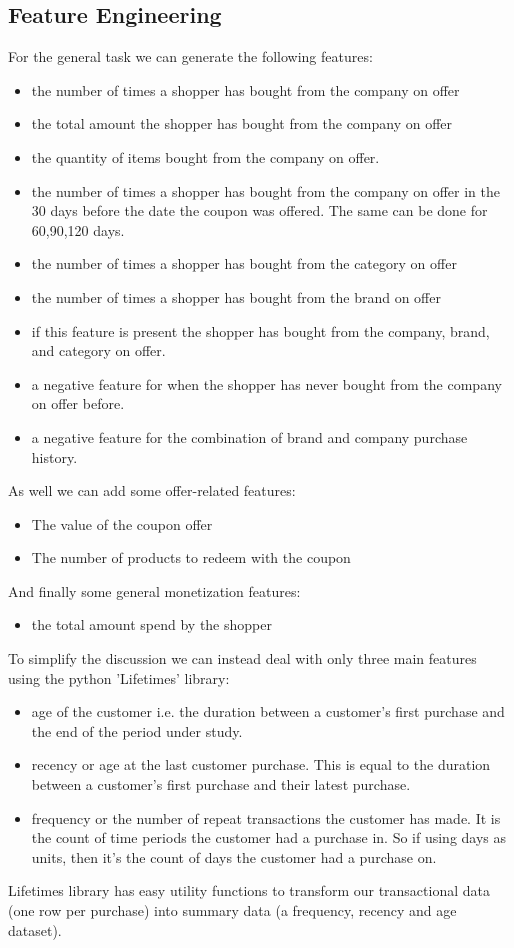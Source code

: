 \documentclass[11pt,fleqn]{book} %
\begin{document}
\begin{remark}
\section{Feature Engineering}

For the general task we can generate the following features:
\begin{itemize}
\item the number of times a shopper has bought from the company on offer
\item the total amount the shopper has bought from the company on offer
\item the quantity of items bought from the company on offer.
\item the number of times a shopper has bought from the company on offer in the 30 days before the date the coupon was offered. The same can be done for 60,90,120 days.
\item the number of times a shopper has bought from the category on offer
\item the number of times a shopper has bought from the brand on offer
\item if this feature is present the shopper has bought from the company, brand, and category on offer.
\item a negative feature for when the shopper has never bought from the company on offer before.
\item a negative feature for the combination of brand and company purchase history.
\end{itemize}
As well we can add some offer-related features:
\begin{itemize}
\item The value of the coupon offer
\item The number of products to redeem with the coupon
\end{itemize}
And finally some general monetization features:
\begin{itemize}
\item the total amount spend by the shopper
\end{itemize}
To simplify the discussion we can instead deal with only three main features using the python 'Lifetimes' library:
\begin{itemize}
\item age of the customer i.e. the duration between a customer’s first purchase and the end of the period under study.
\item recency or age at the last customer purchase. This is equal to the duration between a customer’s first purchase and their latest purchase. 
\item frequency or the number of repeat transactions the customer has made. It is the count of time periods the customer had a purchase in. So if using days as units, then it’s the count of days the customer had a purchase on.
\end{itemize}
Lifetimes library has easy utility functions to transform our transactional data (one row per purchase) into summary data (a frequency, recency and age dataset).


\end{remark}
\end{document}
